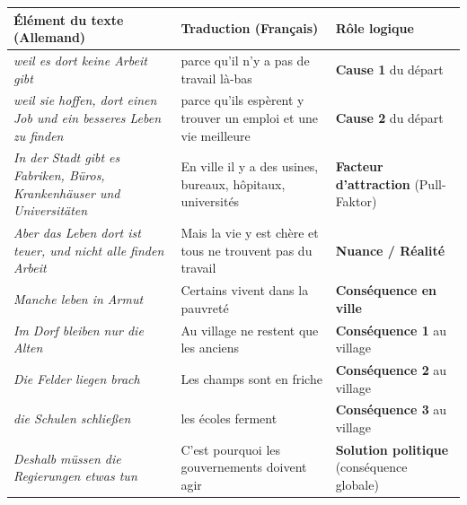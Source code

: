 \documentclass[11pt]{article}
\newcommand{\all}[1]{\ifmmode\text{\textit{#1}}\else\begingroup\selectlanguage{ngerman}\itshape #1\endgroup\fi}
\begin{document}
\begin{center}
\begin{tabularx}{\linewidth}{|X|X|X|}
\hline
\rowcolor{popblueL}
\textbf{Élément du texte (Allemand)} & \textbf{Traduction (Français)} & \textbf{Rôle logique} \\ \hline
\all{weil es dort keine Arbeit gibt} & parce qu'il n'y a pas de travail là-bas & \textbf{Cause 1} du départ \\ \hline
\all{weil sie hoffen, dort einen Job und ein besseres Leben zu finden} & parce qu'ils espèrent y trouver un emploi et une vie meilleure & \textbf{Cause 2} du départ \\ \hline
\all{In der Stadt gibt es Fabriken, Büros, Krankenhäuser und Universitäten} & En ville il y a des usines, bureaux, hôpitaux, universités & \textbf{Facteur d'attraction} (Pull-Faktor) \\ \hline
\all{Aber das Leben dort ist teuer, und nicht alle finden Arbeit} & Mais la vie y est chère et tous ne trouvent pas du travail & \textbf{Nuance / Réalité} \\ \hline
\all{Manche leben in Armut} & Certains vivent dans la pauvreté & \textbf{Conséquence en ville} \\ \hline
\all{Im Dorf bleiben nur die Alten} & Au village ne restent que les anciens & \textbf{Conséquence 1} au village \\ \hline
\all{Die Felder liegen brach} & Les champs sont en friche & \textbf{Conséquence 2} au village \\ \hline
\all{die Schulen schließen} & les écoles ferment & \textbf{Conséquence 3} au village \\ \hline
\all{Deshalb müssen die Regierungen etwas tun} & C'est pourquoi les gouvernements doivent agir & \textbf{Solution politique} (conséquence globale) \\ \hline
\end{tabularx}
\end{center}
\end{document}
